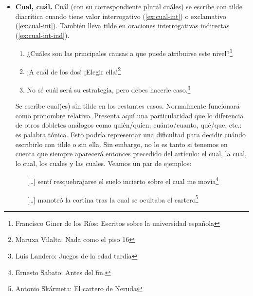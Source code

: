 \documentclass[twocolumn,11pts]{IEEEtran}
\begin{document}
\begin{itemize}
\item \textbf{Cual, cuál.} Cuál (con su correspondiente plural cuáles) se escribe con tilde diacrítica cuando tiene valor interrogativo (\ref{ex:cual-int}) o exclamativo (\ref{ex:cual-int}). También lleva tilde en oraciones interrogativas indirectas (\ref{ex:cual-int-ind}).
\begin{enumerate}[\itshape]
\item\label{ex:cual-int} ¿Cuáles son las principales causas a que puede atribuirse este nivel?\footnote{Francisco Giner de los Ríos: Escritos sobre la universidad española}
\item\label{ex:cual-exc} ¡A cuál de los dos! ¡Elegir ella!\footnote{Maruxa Vilalta: Nada como el piso 16}
\item\label{ex:cual-int-ind} No sé cuál será su estrategia, pero debes hacerle caso.\footnote{Luis Landero: Juegos de la edad tardía}
\end{enumerate}

Se escribe cual(es) sin tilde en los restantes casos. Normalmente funcionará como pronombre relativo. Presenta aquí una particularidad que lo diferencia de otros dobletes análogos como quién/quien, cuánto/cuanto, qué/que, etc.: es palabra tónica. Esto podría representar una dificultad para decidir cuándo escribirlo con tilde o sin ella. Sin embargo, no lo es tanto si tenemos en cuenta que siempre aparecerá entonces precedido del artículo: el cual, la cual, lo cual, los cuales y las cuales. Veamos un par de ejemplos:
\begin{enumerate}[\itshape]
\item[]  [\dots] sentí resquebrajarse el suelo incierto sobre el cual me movía\footnote{Ernesto Sabato: Antes del fin.}
\item[]  [\dots] manoteó la cortina tras la cual se ocultaba el cartero\footnote{Antonio Skármeta: El cartero de Neruda}
\end{enumerate}


\end{itemize}
\end{document}
